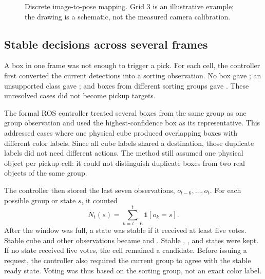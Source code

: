 \begin{figure}[H]\centering
{}
\caption{Discrete image-to-pose mapping. Grid 3 is an illustrative example; the drawing is a schematic, not the measured camera calibration.}
\end{figure}

\subsection{Stable decisions across several frames}

A box in one frame was not enough to trigger a pick. For each cell, the controller first converted the current detections into a sorting observation. No box gave ; an unsupported class gave ; and boxes from different sorting groups gave . These unresolved cases did not become pickup targets.

The formal ROS controller treated several boxes from the same group as one group observation and used the highest-confidence box as its representative. This addressed cases where one physical cube produced overlapping boxes with different color labels. Since all cube labels shared a destination, those duplicate labels did not need different actions. The method still assumed one physical object per pickup cell: it could not distinguish duplicate boxes from two real objects of the same group.

The controller then stored the last seven observations, $o_{t-6},\ldots,o_t$. For each possible group or state $s$, it counted
\begin{equation}
    N_t(s)=\sum_{k=t-6}^{t}\mathbf{1}[o_k=s].
\end{equation}
After the window was full, a state was stable if it received at least five votes. Stable cube and other observations became  and . Stable , , and  states were kept. If no state received five votes, the cell remained a candidate. Before issuing a request, the controller also required the current group to agree with the stable ready state. Voting was thus based on the sorting group, not an exact color label.

